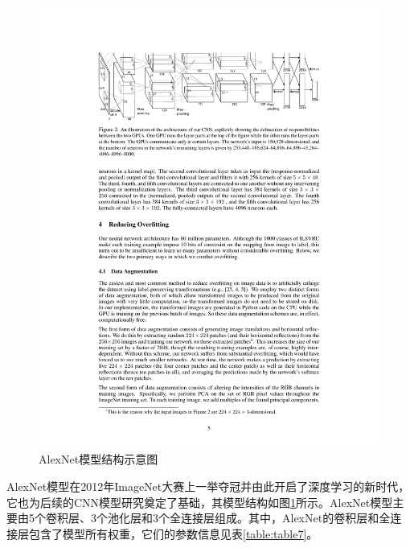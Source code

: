 \begin{figure}[htbp]
    \centering
    \includegraphics[width=1.0\textwidth]{figures/alexnet.pdf}
    \caption{AlexNet模型结构示意图 \cite{krizhevsky2012imagenet}}\label{figure:figure17}
\end{figure}

AlexNet模型在2012年ImageNet大赛上一举夺冠并由此开启了深度学习的新时代，它也为后续的CNN模型研究奠定了基础，其模型结构如图\ref{figure:figure17}所示。AlexNet模型主要由5个卷积层、3个池化层和3个全连接层组成。其中，AlexNet的卷积层和全连接层包含了模型所有权重，它们的参数信息见表\ref{table:table7}。

